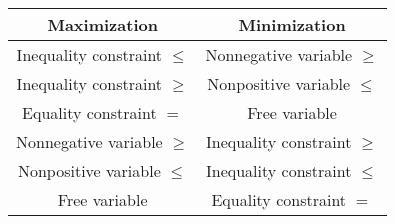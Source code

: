 \begin{tabular}{c|c}
Maximization & Minimization \\
\hline
Inequality constraint $\le$ & Nonnegative variable $\ge$ \\
Inequality constraint $\ge$ & Nonpositive variable $\le$ \\
Equality constraint $=$ & Free variable \\
Nonnegative variable $\ge$ & Inequality constraint $\ge$ \\
Nonpositive variable $\le$ & Inequality constraint $\le$ \\
Free variable & Equality constraint $=$ \\
\end{tabular}